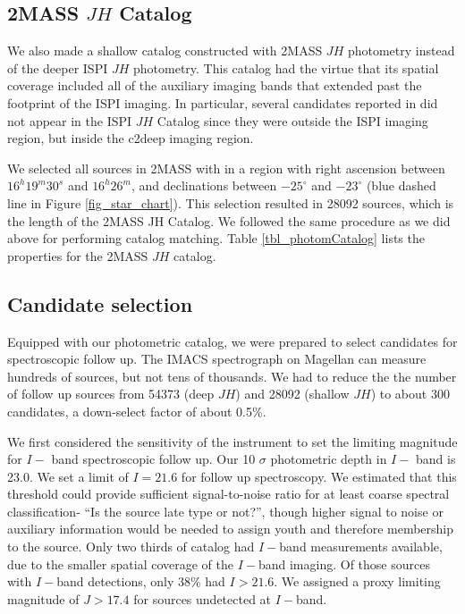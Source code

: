\subsection{2MASS $JH$ Catalog}
We also made a shallow catalog constructed with 2MASS $JH$ photometry instead of the deeper ISPI $JH$ photometry.  This catalog had the virtue that its spatial coverage included all of the auxiliary imaging bands that extended past the footprint of the ISPI imaging.  In particular, several candidates reported in \citet{2010ApJ...720.1374H} did not appear in the ISPI $JH$ Catalog since they were outside the ISPI imaging region, but inside the c2deep imaging region.

We selected all sources in 2MASS with in a region with right ascension between $16^h19^m30^s$ and $16^h26^m$, and declinations between $-25^{\circ}$ and $-23^{\circ}$ (blue dashed line in Figure \ref{fig_star_chart}).  This selection resulted in 28092 sources, which is the length of the 2MASS JH Catalog.  We followed the same procedure as we did above for performing catalog matching.  Table \ref{tbl_photomCatalog} lists the properties for the 2MASS $JH$ catalog.


\subsection{Candidate selection}


Equipped with our photometric catalog, we were prepared to select candidates for spectroscopic follow up.  The IMACS spectrograph on Magellan can measure hundreds of sources, but not tens of thousands.  We had to reduce the the number of follow up sources from 54373 (deep $JH$) and 28092 (shallow $JH$) to about 300 candidates, a down-select factor of about 0.5\%.  

We first considered the sensitivity of the instrument to set the limiting magnitude for $I-$ band spectroscopic follow up.  Our 10 $\sigma$ photometric depth in $I-$ band is 23.0.  We set a limit of $I=21.6$ for follow up spectroscopy.  We estimated that this threshold could provide sufficient signal-to-noise ratio for at least coarse spectral classification- ``Is the source late type or not?'', though higher signal to noise or auxiliary information would be needed to assign youth and therefore membership to the source.  Only two thirds of catalog had $I-$band measurements available, due to the smaller spatial coverage of the $I-$band imaging.  Of those sources with $I-$band detections, only 38\% had $I>21.6$.  We assigned a proxy limiting magnitude of $J>17.4$ for sources undetected at $I-$band.


